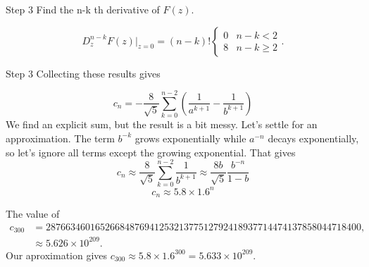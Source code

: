 \documentclass[portrait,fleqn,12pt]{beamer}
\begin{document}
\begin{frame}{Step 3}
Find the n-k th derivative of $F(z) $.

\begin{equation}
D^{n-k} _z F(z ) \vert_{z=0}  = (n-k) ! \begin{cases} 0 &  n -k < 2 \\  8  & n -k \geq  2 \end{cases}.
\end{equation}
\end{frame}
\begin{frame}{Step 3}
Collecting these results gives

\[
 c_n = -\frac{8}{\sqrt{5}} \sum_{k=0}^{n-2} \left ( \frac{1}{a^{k+1}} - \frac{1}{b^{k+1}} \right) 
\]
We find an explicit sum, but the result is a bit messy.  Let's settle for an approximation. The term $b^{-k}$ grows exponentially while $a^{-n}$ decays exponentially, so let's ignore all terms except the growing exponential. That gives
\[
 c_n \approx  \frac{8}{\sqrt{5}} \sum_{k=0}^{n-2} \frac{1}{b^{k+1}} \approx  \frac{8 b}{\sqrt{5}} \frac{{{b}^{-n}}}{1-b}
\]
\begin{equation}
   c_n \approx 5.8 \times 1.6^n
\end{equation}
\end{frame}

\begin{frame}
The value of 
\begin{align*}
c_{300} &= 2876634601652668487694125321377512792418937714474137858044718400, \\
             &\approx 5.626 \times 10^{209}.
\end{align*}
Our aproximation gives $c_{300} \approx 5.8 \times 1.6^{300}  =  5.633 \times 10^{209}.$

\end{frame}
\end{document}
